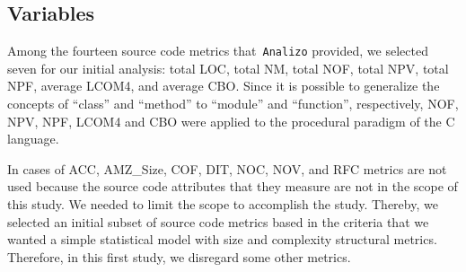\documentclass[conference]{IEEEtran}
\newcommand{\TODO}[1]{{\color{red}\textbf{\uwave{#1}}}}
\begin{document}
\subsection{Variables}
\label{variables}

Among the fourteen source code metrics that~\texttt{Analizo} provided, 
we selected seven for our initial analysis: 
%
total LOC, total NM, total NOF, total NPV, total NPF, average LCOM4,
and average CBO.
%
Since it is possible to generalize the concepts of ``class'' and ``method''
to ``module'' and ``function'', respectively, NOF, NPV, NPF, LCOM4 and CBO 
were applied to the procedural paradigm of the C language. 

In cases of ACC, AMZ\_Size, COF, DIT, NOC, NOV, and RFC metrics are not used 
because the source code attributes that they measure are not in the scope of this study.
%
We needed to limit the scope to accomplish the study. Thereby, we selected an initial 
subset of source code metrics based in the criteria that we wanted a simple
statistical model with size and complexity structural metrics. 
%
Therefore, in this first study, we disregard some other metrics.
\end{document}
